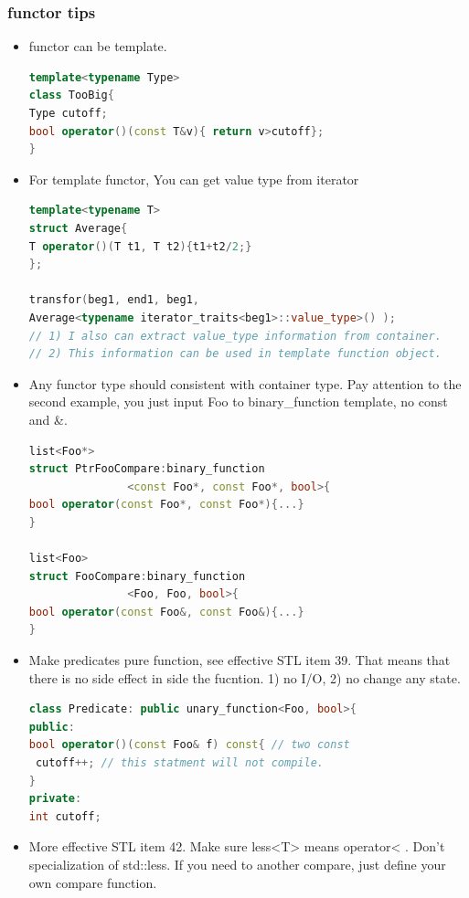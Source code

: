 \documentclass[a4paper,12pt,twoside]{book}
\begin{document}
\subsubsection{functor tips}

\begin{itemize}

\item functor can be template.
\begin{lstlisting}[frame=single, language=c++]
template<typename Type>
class TooBig{
Type cutoff;
bool operator()(const T&v){ return v>cutoff};
}
\end{lstlisting}

\item For template functor, You can get value type from iterator
\begin{lstlisting}[frame=single, language=c++]
template<typename T>
struct Average{
T operator()(T t1, T t2){t1+t2/2;}
};

transfor(beg1, end1, beg1,
Average<typename iterator_traits<beg1>::value_type>() );
// 1) I also can extract value_type information from container.
// 2) This information can be used in template function object.
\end{lstlisting}


\item Any functor type should consistent with container type. Pay attention to the second example, you just input Foo to binary\_function template, no const and \&.
\begin{lstlisting}[frame=single, language=c++]
list<Foo*>
struct PtrFooCompare:binary_function
               <const Foo*, const Foo*, bool>{
bool operator(const Foo*, const Foo*){...}
}

list<Foo>
struct FooCompare:binary_function
               <Foo, Foo, bool>{
bool operator(const Foo&, const Foo&){...}
}
\end{lstlisting}


\item Make predicates pure function, see effective STL item 39. That means that there is no side effect in side the fucntion. 1) no I/O, 2) no change any state.
\begin{lstlisting}[frame=single, language=c++]
class Predicate: public unary_function<Foo, bool>{
public:
bool operator()(const Foo& f) const{ // two const
 cutoff++; // this statment will not compile.
}
private:
int cutoff;
\end{lstlisting}


\item More effective STL item 42. Make sure less<T> means operator< . Don't specialization of std::less. If you need to another compare, just define your own compare function.


\end{itemize}
\end{document}
